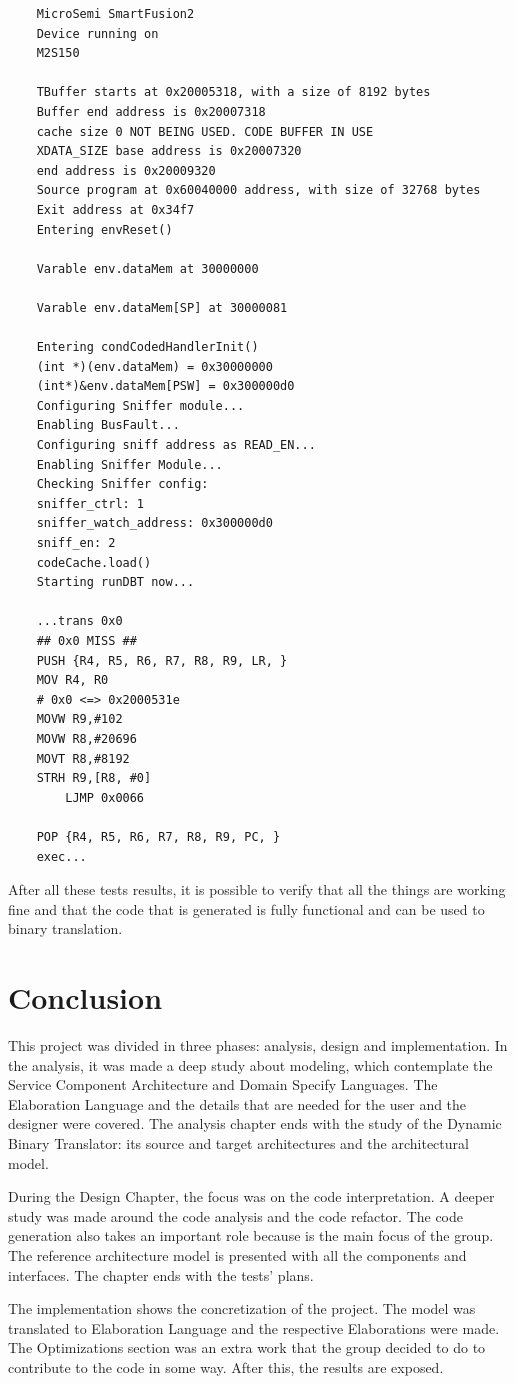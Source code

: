 \documentclass[11pt]{report}
\begin{document}
	\begin{lstlisting}
	MicroSemi SmartFusion2
	Device running on   
	M2S150        
	
	TBuffer starts at 0x20005318, with a size of 8192 bytes
	Buffer end address is 0x20007318
	cache size 0 NOT BEING USED. CODE BUFFER IN USE
	XDATA_SIZE base address is 0x20007320
	end address is 0x20009320
	Source program at 0x60040000 address, with size of 32768 bytes
	Exit address at 0x34f7
	Entering envReset()
	
	Varable env.dataMem at 30000000

	Varable env.dataMem[SP] at 30000081
	
	Entering condCodedHandlerInit()
	(int *)(env.dataMem) = 0x30000000
	(int*)&env.dataMem[PSW] = 0x300000d0
	Configuring Sniffer module...
	Enabling BusFault...
	Configuring sniff address as READ_EN...
	Enabling Sniffer Module...
	Checking Sniffer config:
	sniffer_ctrl: 1
	sniffer_watch_address: 0x300000d0
	sniff_en: 2
	codeCache.load()
	Starting runDBT now...
	
	...trans 0x0
	## 0x0 MISS ##
	PUSH {R4, R5, R6, R7, R8, R9, LR, }
	MOV R4, R0
	# 0x0 <=> 0x2000531e
	MOVW R9,#102
	MOVW R8,#20696
	MOVT R8,#8192
	STRH R9,[R8, #0]
		LJMP 0x0066
	
	POP {R4, R5, R6, R7, R8, R9, PC, }
	exec...

	\end{lstlisting}
	After all these tests results, it is possible to verify that all the things are working fine and that the code that is generated is fully functional and can be used to binary translation.
	
	
	
	

\chapter{Conclusion}

	\par This project was divided in three phases: analysis, design and implementation. In the analysis, it was made a deep study about modeling, which contemplate the Service Component Architecture and Domain Specify Languages. The Elaboration Language and the details that are needed for the user and the designer were covered. The analysis chapter ends with the study of the Dynamic Binary Translator: its source and target architectures and the architectural model.
	\par During the Design Chapter, the focus was on the code interpretation. A deeper study was made around the code analysis and the code refactor. The code generation also takes an important role because is the main focus of the group. The reference architecture model is presented with all the components and interfaces. The chapter ends with the tests' plans.
	\par The implementation shows the concretization of the project. The model was translated to Elaboration Language and the respective Elaborations were made. The Optimizations section was an extra work that the group decided to do to contribute to the code in some way. After this, the results are exposed.
	
\end{document}
